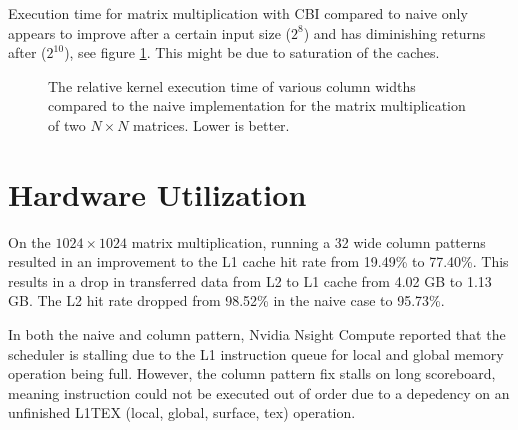 Execution time for matrix multiplication with CBI compared to naive only appears to improve after a certain input size ($2^8$) and has diminishing returns after ($2^10$), see figure \ref{fig:mm_naive_vs_cbi}.
This might be  due to saturation of the caches.

\begin{figure}[H]
    \centering
    \caption{
        The relative kernel execution time of various column widths compared to the naive implementation for the matrix multiplication of two $N \times N$ matrices. Lower is better.
    }
    \label{fig:mm_naive_vs_cbi}
\end{figure}

\section{Hardware Utilization}
On the $1024 \times 1024$ matrix multiplication, running a 32 wide column patterns resulted in an improvement to the L1 cache hit rate from 19.49\% to 77.40\%.
This results in a drop in transferred data from L2 to L1 cache from 4.02 GB to 1.13 GB. 
The L2 hit rate dropped from 98.52\% in the naive case to 95.73\%.

In both the naive and column pattern, Nvidia Nsight Compute reported that the scheduler is stalling due to the L1 instruction queue for local and global memory operation being full.
However, the column pattern fix stalls on long scoreboard, meaning instruction could not be executed out of order due to a depedency on an unfinished L1TEX (local, global, surface, tex) operation.

